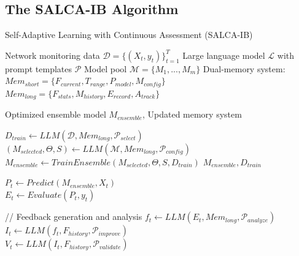\documentclass[conference]{IEEEtran}
\begin{document}
\subsection{The SALCA-IB Algorithm}
\begin{algorithm}[H]
    \caption{Self-Adaptive Learning with Continuous Assessment (SALCA-IB)}
    \label{alg:salca-ib}
    \begin{algorithmic}[1]
    \Require
        \Statex \hspace{-1em}Network monitoring data $\mathcal{D} = \{(X_t, y_t)\}_{t=1}^T$
        \Statex \hspace{-1em}Large language model $\mathcal{L}$ with prompt templates $\mathcal{P}$
        \Statex \hspace{-1em}Model pool $\mathcal{M} = \{M_1, ..., M_m\}$
        \Statex \hspace{-1em}Dual-memory system: $Mem_{short} = \{F_{current}, T_{range}, P_{model}, M_{config}\}$
        \Statex \hspace{-1em}\hspace{3.6em}$Mem_{long} = \{F_{stats}, M_{history}, E_{record}, A_{track}\}$
    
    \Ensure Optimized ensemble model $M_{ensemble}$, Updated memory system
    
    \vspace{0.5em}
        \State $D_{train} \gets LLM(\mathcal{D}, Mem_{long}, \mathcal{P}_{select})$  \\
        \State $(M_{selected}, \Theta, S) \gets LLM(\mathcal{M}, Mem_{long}, \mathcal{P}_{config})$  \\
        \State $M_{ensemble} \gets TrainEnsemble(M_{selected}, \Theta, S, D_{train})$
        \State \Return $M_{ensemble}, D_{train}$
    \EndFunction
    
            \State $P_t \gets Predict(M_{ensemble}, X_t)$  \\
            \State $E_t \gets Evaluate(P_t, y_t)$  \\
            
            \State // Feedback generation and analysis
            \State $f_t \gets LLM(E_t, Mem_{long}, \mathcal{P}_{analyze})$  \\
            \State $I_t \gets LLM(f_t, F_{history}, \mathcal{P}_{improve})$  \\
            \State $V_t \gets LLM(I_t, F_{history}, \mathcal{P}_{validate})$  \\
            

\end{algorithmic}
\end{algorithm}
\end{document}
